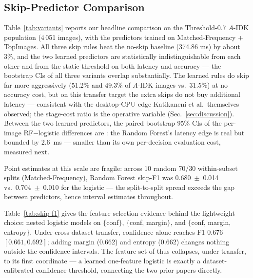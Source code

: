 \documentclass[conference]{IEEEtran}
\begin{document}
\begin{table}[h]
\centering
\caption{Threshold Sweep, Full Matched-Frequency Set (Protocol of \cite{nguyen2024probabilistic})}
\label{tab:threshold-sweep}
{\footnotesize}
\end{table}

\subsection{Skip-Predictor Comparison}
Table~\ref{tab:variants} reports our headline comparison on the Threshold-0.7 $A$-IDK population (4\,051 images), with the predictors trained on Matched-Frequency + TopImages. All three skip rules beat the no-skip baseline (374.86 ms) by about 3\%, and the two learned predictors are statistically indistinguishable from each other and from the static threshold on both latency and accuracy --- the bootstrap CIs of all three variants overlap substantially. The learned rules do skip far more aggressively (51.2\% and 49.3\% of $A$-IDK images vs.\ 31.5\%) at no accuracy cost, but on this transfer target the extra skips do not buy additional latency --- consistent with the desktop-CPU edge Katikaneni et al.\ themselves observed; the stage-cost ratio is the operative variable (Sec.~\ref{sec:discussion}). Between the two learned predictors, the paired bootstrap 95\% CIs of the per-image RF$-$logistic differences are \hspace{-0.3em}: the Random Forest's latency edge is real but bounded by 2.6~ms --- smaller than its own per-decision evaluation cost, measured next.

Point estimates at this scale are fragile: across 10 random 70/30 within-subset splits (Matched-Frequency), Random Forest skip-F1 was 0.680~$\pm$~0.014 vs.\ 0.704~$\pm$~0.010 for the logistic --- the split-to-split spread exceeds the gap between predictors, hence interval estimates throughout.

Table~\ref{tab:skip-f1} gives the feature-selection evidence behind the lightweight choice: nested logistic models on $\{$conf$\}$, $\{$conf, margin$\}$, and $\{$conf, margin, entropy$\}$. Under cross-dataset transfer, confidence alone reaches F1 0.676 $[0.661, 0.692]$; adding margin (0.662) and entropy (0.662) changes nothing outside the confidence intervals. The feature set of \cite{katikaneni2025randomforest} thus collapses, under transfer, to its first coordinate --- a learned one-feature logistic is exactly a dataset-calibrated confidence threshold, connecting the two prior papers directly.
\end{document}
